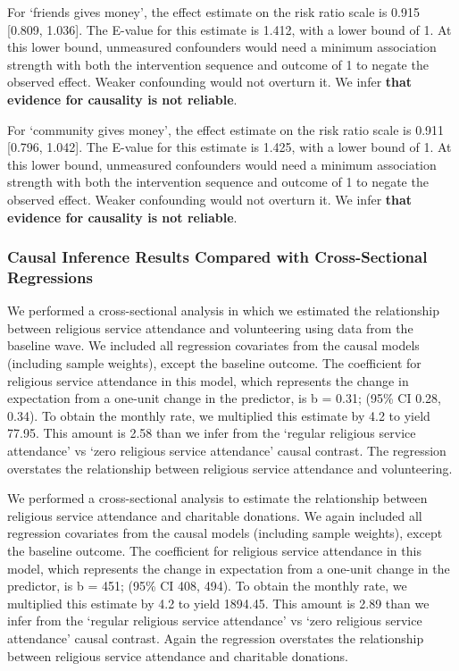 \documentclass[
  single column]{article}
\begin{document}
For `friends gives money', the effect estimate on the risk ratio scale
is 0.915 {[}0.809, 1.036{]}. The E-value for this estimate is 1.412,
with a lower bound of 1. At this lower bound, unmeasured confounders
would need a minimum association strength with both the intervention
sequence and outcome of 1 to negate the observed effect. Weaker
confounding would not overturn it. We infer \textbf{that evidence for
causality is not reliable}.

For `community gives money', the effect estimate on the risk ratio scale
is 0.911 {[}0.796, 1.042{]}. The E-value for this estimate is 1.425,
with a lower bound of 1. At this lower bound, unmeasured confounders
would need a minimum association strength with both the intervention
sequence and outcome of 1 to negate the observed effect. Weaker
confounding would not overturn it. We infer \textbf{that evidence for
causality is not reliable}.

\subsubsection{Causal Inference Results Compared with Cross-Sectional
Regressions}\label{causal-inference-results-compared-with-cross-sectional-regressions}

We performed a cross-sectional analysis in which we estimated the
relationship between religious service attendance and volunteering using
data from the baseline wave. We included all regression covariates from
the causal models (including sample weights), except the baseline
outcome. The coefficient for religious service attendance in this model,
which represents the change in expectation from a one-unit change in the
predictor, is b = 0.31; (95\% CI 0.28, 0.34). To obtain the monthly
rate, we multiplied this estimate by 4.2 to yield 77.95. This amount is
2.58 than we infer from the `regular religious service attendance' vs
`zero religious service attendance' causal contrast. The regression
overstates the relationship between religious service attendance and
volunteering.

We performed a cross-sectional analysis to estimate the relationship
between religious service attendance and charitable donations. We again
included all regression covariates from the causal models (including
sample weights), except the baseline outcome. The coefficient for
religious service attendance in this model, which represents the change
in expectation from a one-unit change in the predictor, is b = 451;
(95\% CI 408, 494). To obtain the monthly rate, we multiplied this
estimate by 4.2 to yield 1894.45. This amount is 2.89 than we infer from
the `regular religious service attendance' vs `zero religious service
attendance' causal contrast. Again the regression overstates the
relationship between religious service attendance and charitable
donations.
\end{document}
